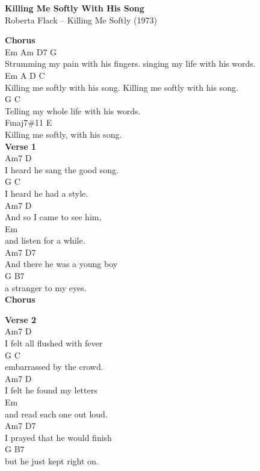 \documentclass[a4paper]{article}
\begin{document}
    \begin{center}
        \textbf{Killing Me Softly With His Song}
        ~\\
        Roberta Flack -- Killing Me Softly (1973)
    \end{center}
    {
        \scriptsize
        \textbf{Chorus}
        ~\\
        {
            \cutive
            \obeyspaces
 Em                       Am        D7                       G
\\
Strumming my pain with his fingers.  singing my life with his words.
\\
 Em                      A                       D        C
\\
Killing me softly with his song.  Killing me softly with his song.
\\
           G               C
\\
Telling my whole life with his words.
\\
           Fmaj7\#11           E
\\
Killing me softly,  with his song.
\\

        }
        \textbf{Verse 1}
        ~\\
        {
            \cutive
            \obeyspaces
Am7        D
\\
I heard he sang the good song.
\\
G          C
\\
I heard he had a style.
\\
Am7        D
\\
And so I came to see him,
\\
    Em
\\
and listen for a while.
\\
Am7          D7
\\
And there he was a young boy
\\
G          B7
\\
a stranger to my eyes.
\\

        }
        \textbf{Chorus}
        ~\\
        {
            \cutive
            \obeyspaces

        }
        \textbf{Verse 2}
        ~\\
        {
            \cutive
            \obeyspaces
Am7        D
\\
I felt all flushed with fever
\\
G          C
\\
embarrassed by the crowd.
\\
Am7        D
\\
I felt he found my letters
\\
    Em
\\
and read each one out loud.
\\
Am7          D7
\\
I prayed that he would finish
\\
G          B7
\\
but he just kept right on.
\\

}}
\end{document}
